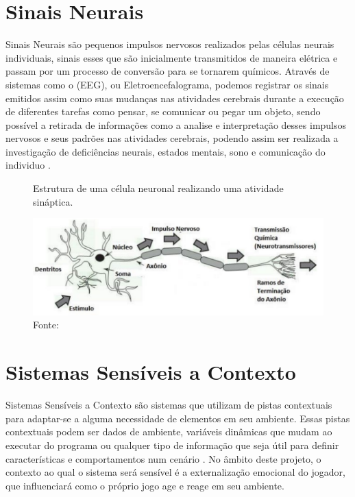 \section{Sinais Neurais}
Sinais Neurais são pequenos impulsos nervosos realizados pelas células neurais individuais, sinais esses que são inicialmente transmitidos de maneira elétrica e passam por um processo de conversão para se tornarem químicos. Através de sistemas como o (EEG), ou Eletroencefalograma, podemos registrar os sinais emitidos assim como suas mudanças nas atividades cerebrais durante a execução de diferentes tarefas como pensar, se comunicar ou pegar um objeto, sendo possível a retirada de informações como a analise e interpretação desses impulsos nervosos e seus padrões nas atividades cerebrais, podendo assim ser realizada a investigação de deficiências neurais, estados mentais, sono e comunicação do individuo \cite{rocha2022analise}.

\begin{figure}[h]
    \centering
    \caption{Estrutura de uma célula neuronal realizando uma atividade sináptica.}
    \includegraphics[width=12cm]{Figuras/celula-neural.png}
    \caption*{Fonte: \cite{rocha2022analise}}
    \label{fig:celula_neural}
\end{figure}

\section{Sistemas Sensíveis a Contexto}
Sistemas Sensíveis a Contexto são sistemas que utilizam de pistas contextuais para adaptar-se a alguma necessidade de elementos em seu ambiente. Essas pistas contextuais podem ser dados de ambiente, variáveis dinâmicas que mudam ao executar do programa ou qualquer tipo de informação que seja útil para definir características e comportamentos num cenário \cite{vieira2009modelos}. No âmbito deste projeto, o contexto ao qual o sistema será sensível é a externalização emocional do jogador, que influenciará como o próprio jogo age e reage em seu ambiente.

